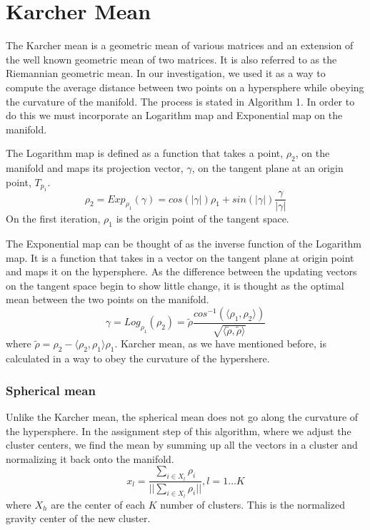 \documentclass[../tech_report_1.tex]{subfiles}
\begin{document}
\part*{Karcher Mean }

The Karcher mean is a geometric mean of various matrices and an extension
of the well known geometric mean of two matrices. It is also referred
to as the Riemannian geometric mean. In our investigation, we used
it as a way to compute the average distance between two points on
a hypersphere while obeying the curvature of the manifold. The process
is stated in Algorithm 1. In order to do this we must incorporate an
Logarithm map and Exponential map on the manifold. 




The Logarithm map is defined as a function that takes a point, $\rho_{2}$,
on the manifold and maps its projection vector, $\gamma$, on the
tangent plane at an origin point, $T_{p_{1}}$. 
\begin{equation}
\rho_{2}=Exp_{\rho_{1}}(\gamma)=cos(|\gamma|)\rho_{1}+sin(|\gamma|)\frac{\gamma}{|\gamma|}\label{eq:1}
\end{equation}
On the first iteration, $\rho_{1}$ is the origin point of the tangent
space.

The Exponential map can be thought of as the inverse function of the
Logarithm map. It is a function that takes in a vector on the tangent
plane at origin point and maps it on the hypersphere. As the difference
between the updating vectors on the tangent space begin to show little
change, it is thought as the optimal mean between the two points on
the manifold.
\begin{equation}
\gamma=Log_{\rho_{1}}(\rho_{2})=\tilde{\rho}\frac{cos^{-1}(\langle\rho_{1},\rho_{2}\rangle)}{\sqrt{\langle\tilde{\rho},\tilde{\rho}\rangle}}\label{eq:2}
\end{equation}
where $\tilde{\rho}=\rho_{2}-\langle\rho_{2},\rho_{1}\rangle\rho_{1}$.
Karcher mean, as we have mentioned before, is calculated in a way
to obey the curvature of the hypershere.


\section*{Spherical mean}

Unlike the Karcher mean, the spherical mean does not go along the
curvature of the hypersphere. In the assignment step of this algorithm,
where we adjust the cluster centers, we find the mean by summing up
all the vectors in a cluster and normalizing it back onto the manifold.
\[
x_{l}=\frac{\sum_{i\in X_{l}}\rho_{i}}{||\sum_{i\in X_{l}}\rho_{i}||},l=1\dots K
\]
 where $X_{h}$ are the center of each $K$ number of clusters. This
is the normalized gravity center of the new cluster. 
\end{document}
